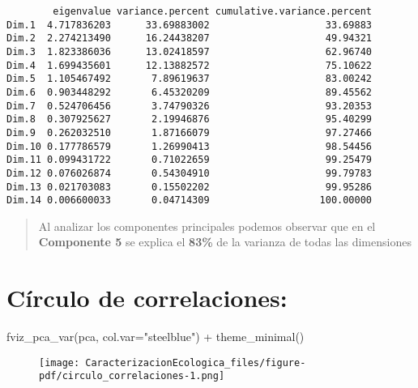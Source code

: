 \documentclass[
  10pt,
  letterpaper,
  DIV=11,
  numbers=noendperiod]{scrreprt}
\newenvironment{Shaded}{\begin{snugshade}}{\end{snugshade}}
\newcommand{\AttributeTok}[1]{\textcolor[rgb]{0.40,0.45,0.13}{#1}}
\newcommand{\FunctionTok}[1]{\textcolor[rgb]{0.28,0.35,0.67}{#1}}
\newcommand{\NormalTok}[1]{\textcolor[rgb]{0.00,0.23,0.31}{#1}}
\newcommand{\SpecialCharTok}[1]{\textcolor[rgb]{0.37,0.37,0.37}{#1}}
\newcommand{\StringTok}[1]{\textcolor[rgb]{0.13,0.47,0.30}{#1}}
\begin{document}
\begin{verbatim}
        eigenvalue variance.percent cumulative.variance.percent
Dim.1  4.717836203      33.69883002                    33.69883
Dim.2  2.274213490      16.24438207                    49.94321
Dim.3  1.823386036      13.02418597                    62.96740
Dim.4  1.699435601      12.13882572                    75.10622
Dim.5  1.105467492       7.89619637                    83.00242
Dim.6  0.903448292       6.45320209                    89.45562
Dim.7  0.524706456       3.74790326                    93.20353
Dim.8  0.307925627       2.19946876                    95.40299
Dim.9  0.262032510       1.87166079                    97.27466
Dim.10 0.177786579       1.26990413                    98.54456
Dim.11 0.099431722       0.71022659                    99.25479
Dim.12 0.076026874       0.54304910                    99.79783
Dim.13 0.021703083       0.15502202                    99.95286
Dim.14 0.006600033       0.04714309                   100.00000
\end{verbatim}

\begin{quote}
Al analizar los componentes principales podemos observar que en el
\textbf{Componente 5} se explica el \textbf{83\%} de la varianza de
todas las dimensiones
\end{quote}

\hypertarget{cuxedrculo-de-correlaciones}{%
\section{Círculo de correlaciones:}\label{cuxedrculo-de-correlaciones}}

\begin{Shaded}
\begin{Highlighting}[numbers=left,,]
\FunctionTok{fviz\_pca\_var}\NormalTok{(pca,}
             \AttributeTok{col.var=}\StringTok{"steelblue"}\NormalTok{) }\SpecialCharTok{+} 
  \FunctionTok{theme\_minimal}\NormalTok{()}
\end{Highlighting}
\end{Shaded}

\begin{figure}[tb]

{\centering \texttt{[image: CaracterizacionEcologica\_files/figure-pdf/circulo\_correlaciones-1.png]}

}

\end{figure}
\end{document}
